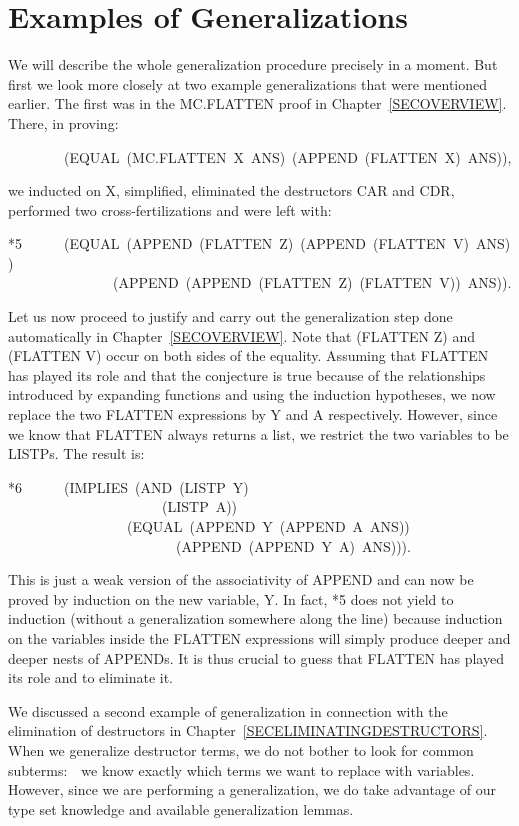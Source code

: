 \documentclass[11pt]{book}
\newenvironment{pubasis}{\begin{flushleft}\ttfamily\small}{\normalsize\rmfamily\end{flushleft}}
\newcommand{\pubdefaulttextsize}{\large}
\begin{document}
\section{Examples of Generalizations}
\pubdefaulttextsize
We will describe the whole generalization procedure precisely in a moment.
But first we  look more closely at two example generalizations that
were mentioned earlier.  The first
was in the MC.FLATTEN proof in Chapter~\ref{SECOVERVIEW}.  There, in
proving:
\begin{pubasis}
~~~~~~~~(EQUAL~(MC.FLAT\-TEN~X~ANS)~(APPEND~(FLAT\-TEN~X)~ANS)),\\
\end{pubasis}
we inducted on X, simplified, eliminated the destructors CAR and CDR,
performed two cross-fertilizations and were left with:
\begin{pubasis}
*5~~~~~~(EQUAL~(APPEND~(FLATTEN~Z)~(APPEND~(FLATTEN~V)~ANS))\\
~~~~~~~~~~~~~~~(APPEND~(APPEND~(FLATTEN~Z)~(FLATTEN~V))~ANS)).\\
\end{pubasis}
Let us now proceed to justify and carry out the generalization step
done automatically in Chapter~\ref{SECOVERVIEW}.
Note that (FLATTEN Z) and (FLATTEN V) occur on both sides
of the equality.  Assuming  that FLATTEN has played its role and that
the conjecture is true because of the relationships introduced by expanding functions and
using the induction hypotheses, we now replace the two
FLATTEN expressions by Y and A respectively.
However, since we know that FLATTEN
always returns a list, we restrict the two variables to be LISTPs.
The result is:
\begin{pubasis}
*6~~~~~~(IMPLIES~(AND~(LISTP~Y)\\
~~~~~~~~~~~~~~~~~~~~~~(LISTP~A))\\
~~~~~~~~~~~~~~~~~(EQUAL~(APPEND~Y~(APPEND~A~ANS))\\
~~~~~~~~~~~~~~~~~~~~~~~~(APPEND~(APPEND~Y~A)~ANS))).\\
\end{pubasis}
This is just a weak version of the associativity of APPEND and can now be proved
by induction on the new variable, Y.  In fact, *5 
does not yield to induction
(without a generalization somewhere along the line) because
induction on the variables inside the FLATTEN expressions will simply
produce deeper and deeper nests of APPENDs.  It is thus
crucial to guess that FLATTEN has played its role and to eliminate it.

We discussed a second example of generalization
in connection with the elimination of destructors in Chapter~\ref{SECELIMINATINGDESTRUCTORS}.  When
we generalize destructor terms, we do not bother to look for
common subterms:~~we know exactly which terms we want to replace
with variables.
However, since we are performing
a generalization, we do take advantage of our type set knowledge and
available generalization lemmas.
\end{document}
